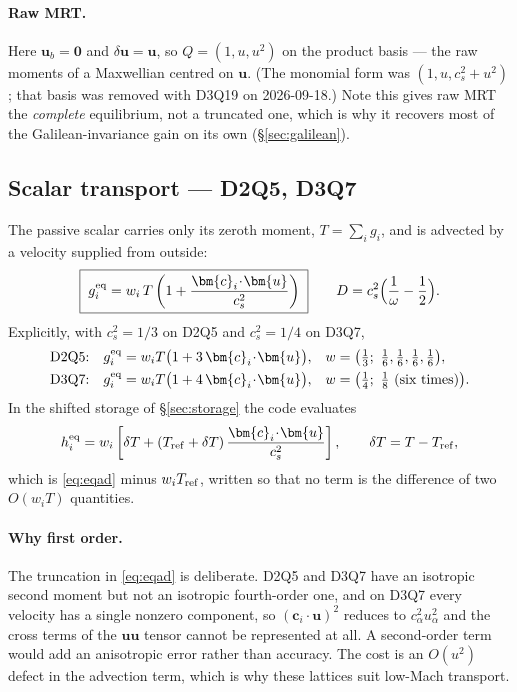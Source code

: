 \documentclass[11pt,a4paper]{article}
\newcommand{\cs}{c_s}
\newcommand{\ci}{\bm{c}_i}
\newcommand{\uu}{\bm{u}}
\begin{document}
\paragraph{Raw MRT.} Here $\uu_b=\bm0$ and $\delta\uu=\uu$, so
$Q=(1,u,u^2)$ on the product basis --- the raw moments of a Maxwellian centred on
$\uu$. (The monomial form was $(1,u,\cs^2+u^2)$; that basis was removed with
D3Q19 on 2026-09-18.) Note this gives raw MRT the
\emph{complete} equilibrium, not a truncated one, which is why it recovers most
of the Galilean-invariance gain on its own (\S\ref{sec:galilean}).

\subsection{Scalar transport --- D2Q5, D3Q7}
\label{sec:eqscalar}

The passive scalar carries only its zeroth moment, $T=\sum_i g_i$, and is
advected by a velocity supplied from outside:
\begin{equation}
  \boxed{\; g_i^{\rm eq} = w_i\,T\left(1+\frac{\ci\!\cdot\!\uu}{\cs^2}\right)\;}
  \qquad
  D = \cs^2\Big(\frac{1}{\omega}-\frac12\Big).
  \label{eq:eqad}
\end{equation}
Explicitly, with $\cs^2=1/3$ on D2Q5 and $\cs^2=1/4$ on D3Q7,
\begin{align}
  \text{D2Q5:}&\quad g_i^{\rm eq} = w_i T\big(1+3\,\ci\!\cdot\!\uu\big),
     & w &= \big(\tfrac13;\ \tfrac16,\tfrac16,\tfrac16,\tfrac16\big), \\
  \text{D3Q7:}&\quad g_i^{\rm eq} = w_i T\big(1+4\,\ci\!\cdot\!\uu\big),
     & w &= \big(\tfrac14;\ \tfrac18\ \text{(six times)}\big).
\end{align}
In the shifted storage of \S\ref{sec:storage} the code evaluates
\begin{equation}
  h_i^{\rm eq} = w_i\left[\delta T + (T_{\rm ref}+\delta T)\,
    \frac{\ci\!\cdot\!\uu}{\cs^2}\right], \qquad \delta T = T-T_{\rm ref},
\end{equation}
which is \eqref{eq:eqad} minus $w_iT_{\rm ref}$, written so that no term is the
difference of two $O(w_iT)$ quantities.

\paragraph{Why first order.} The truncation in \eqref{eq:eqad} is deliberate.
D2Q5 and D3Q7 have an isotropic second moment but not an isotropic fourth-order
one, and on D3Q7 every velocity has a single nonzero component, so
$(\ci\!\cdot\!\uu)^2$ reduces to $c_\alpha^2u_\alpha^2$ and the cross terms of the
$\uu\uu$ tensor cannot be represented at all. A second-order term would add an
anisotropic error rather than accuracy. The cost is an $O(u^2)$ defect in the
advection term, which is why these lattices suit low-Mach transport.
\end{document}
